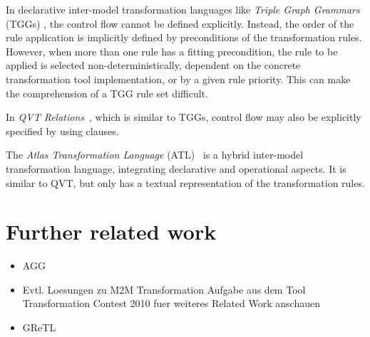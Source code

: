 In declarative inter-model transformation languages like \emph{Triple Graph Grammars} (TGGs) \cite{Sch94}, the control flow cannot be defined explicitly.
Instead, the order of the rule application is implicitly defined by preconditions of the transformation rules.
However, when more than one rule has a fitting precondition, the rule to be applied is selected non-deterministically, dependent on the concrete transformation tool implementation, or by a given rule priority.
This can make the comprehension of a TGG rule set difficult.

In \emph{QVT Relations}~\cite{QVT}, which is similar to TGGs, control flow may also be explicitly specified by using  clauses.

The \emph{Atlas Transformation Language} (ATL)~\cite{ATL} is a hybrid inter-model transformation language, integrating declarative and operational aspects.
It is similar to QVT, but only has a textual representation of the transformation rules.

\section*{Further related work}

\begin{itemize}
\item AGG
\item Evtl. Loesungen zu M2M Transformation Aufgabe aus dem Tool Transformation Contest 2010 fuer weiteres Related Work anschauen
\item GReTL \cite{HE11}
\end{itemize}
